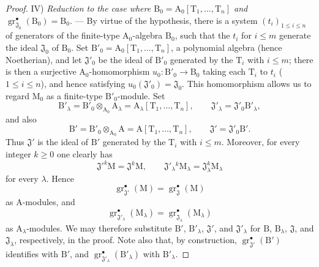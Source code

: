 \begin{proof}
\medskip
\noindent IV) \emph{Reduction to the case where $\mathrm{B}_0=\mathrm{A}_0[\mathrm{T}_1,\ldots,\mathrm{T}_n]$ and $\operatorname{gr}^\bullet_{\mathfrak{J}_0}(\mathrm{B}_0)=\mathrm{B}_0$.} --- By virtue of the hypothesis, there is a system $(t_i)_{1\leqslant i\leqslant n}$ of generators of the finite-type $\mathrm{A}_0$-algebra $\mathrm{B}_0$, such that the $t_i$ for $i\leqslant m$ generate the ideal $\mathfrak{J}_0$ of $\mathrm{B}_0$. Set $\mathrm{B}'_0=\mathrm{A}_0[\mathrm{T}_1,\ldots,\mathrm{T}_n]$, a polynomial algebra (hence Noetherian), and let $\mathfrak{J}'_0$ be the ideal of $\mathrm{B}'_0$ generated by the $\mathrm{T}_i$ with $i\leqslant m$; there is then a surjective $\mathrm{A}_0$-homomorphism $u_0:\mathrm{B}'_0\to\mathrm{B}_0$ taking each $\mathrm{T}_i$ to $t_i$ ($1\leqslant i\leqslant n$), and hence satisfying $u_0(\mathfrak{J}'_0)=\mathfrak{J}_0$. This homomorphism allows us to regard $\mathrm{M}_0$ as a finite-type $\mathrm{B}'_0$-module. Set
\[
  \mathrm{B}'_\lambda=\mathrm{B}'_0\otimes_{\mathrm{A}_0}\mathrm{A}_\lambda
  =\mathrm{A}_\lambda[\mathrm{T}_1,\ldots,\mathrm{T}_n],
  \qquad
  \mathfrak{J}'_\lambda=\mathfrak{J}'_0\mathrm{B}'_\lambda,
\]
and also
\[
  \mathrm{B}'=\mathrm{B}'_0\otimes_{\mathrm{A}_0}\mathrm{A}
  =\mathrm{A}[\mathrm{T}_1,\ldots,\mathrm{T}_n],
  \qquad
  \mathfrak{J}'=\mathfrak{J}'_0\mathrm{B}'.
\]
Thus $\mathfrak{J}'$ is the ideal of $\mathrm{B}'$ generated by the $\mathrm{T}_i$ with $i\leqslant m$. Moreover, for every integer $k\geqslant 0$ one clearly has
\[
  \mathfrak{J}'^k\mathrm{M}=\mathfrak{J}^k\mathrm{M},
  \qquad
  \mathfrak{J}'_\lambda{}^k\mathrm{M}_\lambda
  =\mathfrak{J}_\lambda^k\mathrm{M}_\lambda
\]
for every $\lambda$. Hence
\[
  \operatorname{gr}^\bullet_{\mathfrak{J}'}(\mathrm{M})
  =\operatorname{gr}^\bullet_{\mathfrak{J}}(\mathrm{M})
\]
as $\mathrm{A}$-modules, and
\[
  \operatorname{gr}^\bullet_{\mathfrak{J}'_\lambda}(\mathrm{M}_\lambda)
  =\operatorname{gr}^\bullet_{\mathfrak{J}_\lambda}(\mathrm{M}_\lambda)
\]
as $\mathrm{A}_\lambda$-modules. We may therefore substitute $\mathrm{B}'$, $\mathrm{B}'_\lambda$, $\mathfrak{J}'$, and $\mathfrak{J}'_\lambda$ for $\mathrm{B}$, $\mathrm{B}_\lambda$, $\mathfrak{J}$, and $\mathfrak{J}_\lambda$, respectively, in the proof. Note also that, by construction, $\operatorname{gr}^\bullet_{\mathfrak{J}'}(\mathrm{B}')$ identifies with $\mathrm{B}'$, and $\operatorname{gr}^\bullet_{\mathfrak{J}'_\lambda}(\mathrm{B}'_\lambda)$ with $\mathrm{B}'_\lambda$.


\end{proof}
